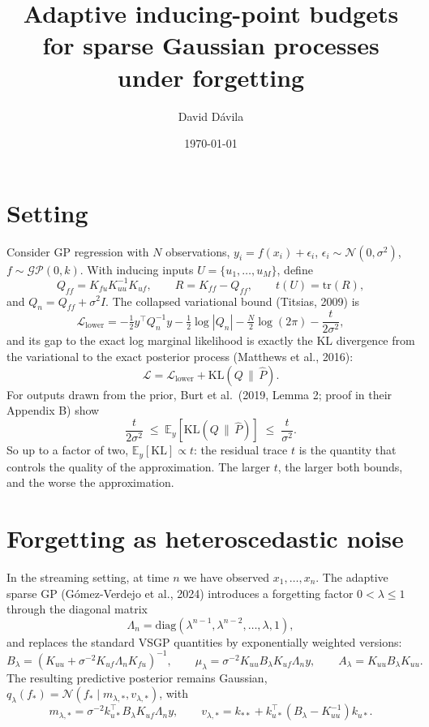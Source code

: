 \documentclass[11pt,a4paper]{article}
\title{\vspace{-2em}\large Adaptive inducing-point budgets for sparse Gaussian processes under forgetting\vspace{-0.5em}}
\author{\normalsize David Dávila}
\date{\normalsize\today}
\theoremstyle{definition}
\theoremstyle{remark}
\newcommand{\KL}{\mathrm{KL}}
\newcommand{\tr}{\mathrm{tr}}
\begin{document}
\maketitle
\vspace{-1.5em}

\section{Setting}

Consider GP regression with $N$ observations, $y_i = f(x_i) + \epsilon_i$, $\epsilon_i \sim \mathcal{N}(0,\sigma^2)$, $f \sim \mathcal{GP}(0,k)$. With inducing inputs $U = \{u_1,\ldots,u_M\}$, define
\[
Q_{ff} = K_{fu}K_{uu}^{-1}K_{uf}, \qquad R = K_{ff} - Q_{ff}, \qquad t(U) = \tr(R),
\]
and $Q_n = Q_{ff} + \sigma^2 I$. The collapsed variational bound (Titsias, 2009) is
\[
\mathcal{L}_{\mathrm{lower}} = -\tfrac12 y^\top Q_n^{-1} y - \tfrac12 \log|Q_n| - \tfrac N2 \log(2\pi) - \frac{t}{2\sigma^2},
\]
and its gap to the exact log marginal likelihood is exactly the KL divergence from the variational to the exact posterior process (Matthews et al., 2016):
\[
\mathcal{L} = \mathcal{L}_{\mathrm{lower}} + \KL(Q\,\|\,\hat P).
\]
For outputs drawn from the prior, Burt et al.\ (2019, Lemma 2; proof in their Appendix B) show
\[
\frac{t}{2\sigma^2} \;\leq\; \mathbb{E}_y\left[\KL(Q\,\|\,\hat P)\right] \;\leq\; \frac{t}{\sigma^2}.
\]
So up to a factor of two, $\mathbb{E}_y[\KL] \propto t$: the residual trace $t$ is the quantity that controls the quality of the approximation. The larger $t$, the larger both bounds, and the worse the approximation.

\section{Forgetting as heteroscedastic noise}

In the streaming setting, at time $n$ we have observed $x_1, \ldots, x_n$. The adaptive sparse GP (Gómez-Verdejo et al., 2024) introduces a forgetting factor $0 < \lambda \leq 1$ through the diagonal matrix
\[
\Lambda_n = \mathrm{diag}\left(\lambda^{n-1}, \lambda^{n-2}, \ldots, \lambda, 1\right),
\]
and replaces the standard VSGP quantities by exponentially weighted versions:
\[
B_\lambda = \left(K_{uu} + \sigma^{-2}K_{uf}\Lambda_n K_{fu}\right)^{-1}, \qquad
\mu_\lambda = \sigma^{-2}K_{uu}B_\lambda K_{uf}\Lambda_n y, \qquad
A_\lambda = K_{uu}B_\lambda K_{uu}.
\]
The resulting predictive posterior remains Gaussian, $q_\lambda(f_*) = \mathcal{N}(f_* \mid m_{\lambda,*}, v_{\lambda,*})$, with
\[
m_{\lambda,*} = \sigma^{-2}k_{u*}^{\top}B_\lambda K_{uf}\Lambda_n y, \qquad
v_{\lambda,*} = k_{**} + k_{u*}^{\top}\left(B_\lambda - K_{uu}^{-1}\right)k_{u*}.
\]
\end{document}
